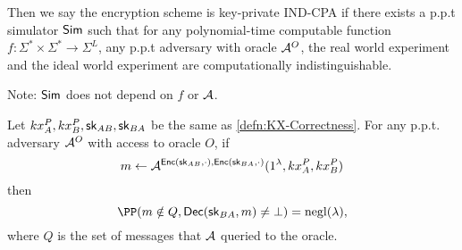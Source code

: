 \begin{definition}
Then we say the encryption scheme is key-private IND-CPA if there exists a p.p.t simulator $\mathsf{Sim}$ such that for any polynomial-time computable function $f: \Sigma^* \times \Sigma^* \to \Sigma^{L}$, any p.p.t adversary with oracle $\mathcal{A}^O$, the real world experiment and the ideal world experiment are computationally indistinguishable.
\end{definition}

Note: $\mathsf{Sim}$ does not depend on $f$ or $\mathcal{A}$.
\begin{definition}
Let $kx^P_A, kx^P_B, {\mathsf{sk}}_{AB}, {\mathsf{sk}}_{BA}$ be the same as \cref{defn:KX-Correctness}. For any p.p.t. adversary $\mathcal{A}^O$ with access to oracle $O$, if
$$m \leftarrow \mathcal{A}^{\mathsf{Enc}({\mathsf{sk}}_{AB}, \cdot), \mathsf{Enc}({\mathsf{sk}}_{BA}, \cdot)}(1^{\lambda}, kx^P_A, kx^P_B)$$
then 
$$\PP(m \notin Q, \Dec(\sk_{BA}, m) \neq \bot) = \negl(\lambda),$$
where $Q$ is the set of messages that $\mathcal{A}$ queried to the oracle.
\end{definition}

